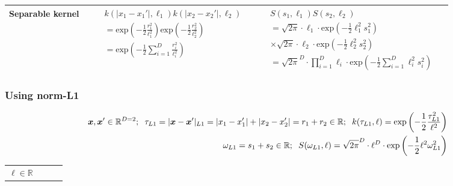 \documentclass[]{interact}
\theoremstyle{plain}%
\theoremstyle{definition}
\theoremstyle{remark}
\begin{document}
\begin{landscape}
\begin{table}[H]
\begin{center}
\begin{tabular}{|c|c|c|c|}
{       {Separable kernel} 
       }
       
        & \multicolumn{1}{|p{7.2cm}|}{\small
         \begin{eqnarray*}
		&&k(|x_1-x_1'|,\ell_1)k(|x_2-x_2'|,\ell_2) \\
		&&= \mathrm{exp}\left(-\frac{1}{2} \frac{r_1^2}{\ell_1^2} \right) \mathrm{exp}\left(-\frac{1}{2} \frac{r_2^2}{\ell_2^2} \right) \\
		&&=\mathrm{exp}\left(-\frac{1}{2} \sum_{i=1}^{D}\frac{r_i^2}{\ell_i^2} \right)
         \end{eqnarray*}
       }
       
       & \multicolumn{1}{|p{8.2cm}|}{\small
         \begin{eqnarray*}
         &&S(s_1,\ell_1)S(s_2,\ell_2) \\
		&&= \sqrt{2\pi} \cdot \ell_1 \cdot \mathrm{exp}\left(-\frac{1}{2} \ell_1^2 s_1^2 \right) \\
		 &&\times  \sqrt{2\pi} \cdot \ell_2 \cdot \mathrm{exp}\left(-\frac{1}{2} \ell_2^2 s_2^2 \right)\\
		&&= \sqrt{2\pi}^D \cdot \prod_{i=1}^D \ell_i \cdot \mathrm{exp}\left(-\frac{1}{2} \sum_{i=1}^D \ell_i^2 s_i^2 \right)
         \end{eqnarray*}         
       } 

       & \multicolumn{1}{|p{6.2cm}|}{\small

       } \\ 
       
       \hline
    \end{tabular}
  \end{center}
\end{table}


\newpage
\subsubsection{Using norm-L1 }
\vspace{-10mm}

\begin{table}[H]
\small
\begin{eqnarray*}
\vspace{-20mm}
&&\bm{x}, \bm{x}' \in \mathbb{R}^{D=2}; \hspace{2mm}\tau_{L1} =|\bm{x}-\bm{x}'|_{L1} = |x_1-x_1'|+|x_2-x_2'| = r_1+r_2 \in \mathbb{R}; \hspace{2mm} k(\tau_{L1},\ell) = \mathrm{exp}\left(-\frac{1}{2} \frac{\tau_{L1}^2}{\ell^2} \right)\\
&& \omega_{L1}= s_1+s_2 \in \mathbb{R}; \hspace{2mm} S(\omega_{L1},\ell) = \sqrt{2\pi}^D \cdot \ell^D \cdot \mathrm{exp}\left(-\frac{1}{2} \ell^2 \omega_{L1}^2 \right)
\end{eqnarray*}
\normalsize
  \begin{center}
    \begin{tabular}{|c|c|c|c|}
       \hline
       \multicolumn{1}{|p{1.5cm}|}{
       \vspace{1mm}
       $\ell \in \mathbb{R}$
       }
       

\end{tabular}
\end{center}
\end{table}
\end{landscape}
\end{document}
